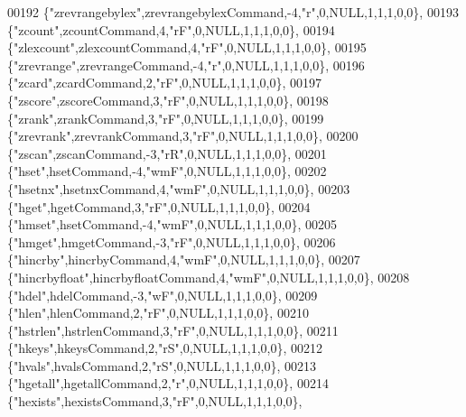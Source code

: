 \begin{DoxyCode}
00192     \{\textcolor{stringliteral}{"zrevrangebylex"},zrevrangebylexCommand,-4,\textcolor{stringliteral}{"r"},0,NULL,1,1,1,0,0\},
00193     \{\textcolor{stringliteral}{"zcount"},zcountCommand,4,\textcolor{stringliteral}{"rF"},0,NULL,1,1,1,0,0\},
00194     \{\textcolor{stringliteral}{"zlexcount"},zlexcountCommand,4,\textcolor{stringliteral}{"rF"},0,NULL,1,1,1,0,0\},
00195     \{\textcolor{stringliteral}{"zrevrange"},zrevrangeCommand,-4,\textcolor{stringliteral}{"r"},0,NULL,1,1,1,0,0\},
00196     \{\textcolor{stringliteral}{"zcard"},zcardCommand,2,\textcolor{stringliteral}{"rF"},0,NULL,1,1,1,0,0\},
00197     \{\textcolor{stringliteral}{"zscore"},zscoreCommand,3,\textcolor{stringliteral}{"rF"},0,NULL,1,1,1,0,0\},
00198     \{\textcolor{stringliteral}{"zrank"},zrankCommand,3,\textcolor{stringliteral}{"rF"},0,NULL,1,1,1,0,0\},
00199     \{\textcolor{stringliteral}{"zrevrank"},zrevrankCommand,3,\textcolor{stringliteral}{"rF"},0,NULL,1,1,1,0,0\},
00200     \{\textcolor{stringliteral}{"zscan"},zscanCommand,-3,\textcolor{stringliteral}{"rR"},0,NULL,1,1,1,0,0\},
00201     \{\textcolor{stringliteral}{"hset"},hsetCommand,-4,\textcolor{stringliteral}{"wmF"},0,NULL,1,1,1,0,0\},
00202     \{\textcolor{stringliteral}{"hsetnx"},hsetnxCommand,4,\textcolor{stringliteral}{"wmF"},0,NULL,1,1,1,0,0\},
00203     \{\textcolor{stringliteral}{"hget"},hgetCommand,3,\textcolor{stringliteral}{"rF"},0,NULL,1,1,1,0,0\},
00204     \{\textcolor{stringliteral}{"hmset"},hsetCommand,-4,\textcolor{stringliteral}{"wmF"},0,NULL,1,1,1,0,0\},
00205     \{\textcolor{stringliteral}{"hmget"},hmgetCommand,-3,\textcolor{stringliteral}{"rF"},0,NULL,1,1,1,0,0\},
00206     \{\textcolor{stringliteral}{"hincrby"},hincrbyCommand,4,\textcolor{stringliteral}{"wmF"},0,NULL,1,1,1,0,0\},
00207     \{\textcolor{stringliteral}{"hincrbyfloat"},hincrbyfloatCommand,4,\textcolor{stringliteral}{"wmF"},0,NULL,1,1,1,0,0\},
00208     \{\textcolor{stringliteral}{"hdel"},hdelCommand,-3,\textcolor{stringliteral}{"wF"},0,NULL,1,1,1,0,0\},
00209     \{\textcolor{stringliteral}{"hlen"},hlenCommand,2,\textcolor{stringliteral}{"rF"},0,NULL,1,1,1,0,0\},
00210     \{\textcolor{stringliteral}{"hstrlen"},hstrlenCommand,3,\textcolor{stringliteral}{"rF"},0,NULL,1,1,1,0,0\},
00211     \{\textcolor{stringliteral}{"hkeys"},hkeysCommand,2,\textcolor{stringliteral}{"rS"},0,NULL,1,1,1,0,0\},
00212     \{\textcolor{stringliteral}{"hvals"},hvalsCommand,2,\textcolor{stringliteral}{"rS"},0,NULL,1,1,1,0,0\},
00213     \{\textcolor{stringliteral}{"hgetall"},hgetallCommand,2,\textcolor{stringliteral}{"r"},0,NULL,1,1,1,0,0\},
00214     \{\textcolor{stringliteral}{"hexists"},hexistsCommand,3,\textcolor{stringliteral}{"rF"},0,NULL,1,1,1,0,0\},

\end{DoxyCode}
